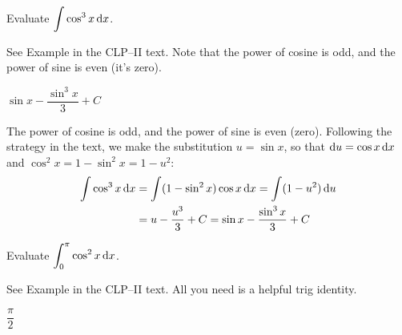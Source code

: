 \subsection*{\Procedural}


\begin{question}[M105 2015A]\label{1.8sincos1}
Evaluate $\displaystyle\int\cos^3x\,\mathrm{d}x$.
\end{question}

\begin{hint}
See Example  in the
CLP--II text. Note that the power of cosine is odd, and the power of sine is even (it's zero).
\end{hint}

\begin{answer}
$ \sin x-\dfrac{\sin^3 x}{3} +C$
\end{answer}

\begin{solution}
The power of cosine is odd, and the power of sine is even (zero).  Following the strategy in the text, we make the substitution $u=\sin x$, so that $\mathrm{d}u=\cos x\,\mathrm{d}x$
and $\cos^2 x = 1-\sin^2 x = 1-u^2$:
\begin{align*}
\int \cos^3x\,\mathrm{d}x
&=\int (1-\sin^2x)\cos x\,\mathrm{d}x
=\int (1-u^2)\,\mathrm{d}u\\
&=u-\frac{u^3}3+C
=\sin x-\frac{\sin^3 x}{3}+C
\end{align*}
\end{solution}


\begin{Mquestion}[2014D]
Evaluate $\displaystyle\int_0^\pi\cos^2x\,\mathrm{d}x$.
\end{Mquestion}

\begin{hint}
See Example  in the
CLP--II text. All you need is a helpful trig identity.
\end{hint}

\begin{answer}
$\dfrac{\pi}{2}$
\end{answer}

